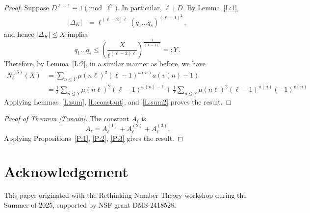 \documentclass[12pt]{amsart}
\begin{document}
\begin{proof}
Suppose $D^{\ell-1}\equiv 1\pmod{\ell^2}$.  In particular, $\ell\nmid D$.
By Lemma~\ref{L:1},
\begin{align*}
|\Delta_K| &= \ell^{(\ell-2)\ell}(q_1 \dots q_s)^{(\ell-1)^2}
\,,
\end{align*}
and hence $|\Delta_K|\leq X$ implies
$$
  q_1\dots q_s\leq \left(\frac{X}{\ell^{(\ell-2)\ell}}\right)^{\frac{1}{(\ell-1)^2}}=:Y
  \,.
$$
Therefore, by Lemma~\ref{L:2}, in a similar manner as before,
we have
\begin{align*}
  N_\ell^{(3)}(X)&=\sum_{n\leq Y} \mu(n\ell)^2(\ell-1)^{u(n)}a(v(n)-1)
\\
&=
\frac{1}{\ell}
\sum_{n\leq Y} \mu(n\ell)^2(\ell-1)^{\omega(n)-1}
+
\frac{1}{\ell}
\sum_{n\leq Y} \mu(n\ell)^2(\ell-1)^{u(n)}
(-1)^{v(n)}
\end{align*}
Applying Lemmas~\ref{L:sum}, \ref{L:constant}, and~\ref{L:sum2} proves the result.
\end{proof}



\begin{proof}[Proof of Theorem \ref{T:main}]
The constant $A_{\ell}$ is
\[ A_{\ell} = A_{\ell}^{(1)} + A_{\ell}^{(2)} + A_{\ell}^{(3)}.\] 
Applying Propositions~\ref{P:1}, \ref{P:2}, \ref{P:3} gives the result.    
\end{proof}

\section*{Acknowledgement}

This paper originated with the Rethinking Number Theory workshop
during the Summer of 2025, supported by NSF grant DMS-2418528.



\end{document}
